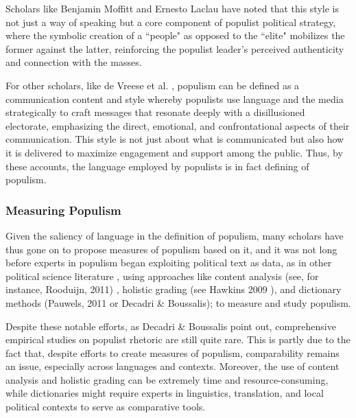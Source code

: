 \documentclass[12pt,letterpaper]{article}
\begin{document}
Scholars like Benjamin Moffitt\autocite{moffittGlobalRisePopulism2016} and Ernesto Laclau\autocite{benvenutoPopulistReasonErnesto2012} have noted that this style is not just a way of speaking but a core component of populist political strategy, where the symbolic creation of a ``people" as opposed to the ``elite" mobilizes the former against the latter, reinforcing the populist leader's perceived authenticity and connection with the masses. 

For other scholars, like de Vreese et al.\autocite{devreesePopulismExpressionPolitical2018} , populism can be defined as a communication content and style whereby populists use language and the media strategically to craft messages that resonate deeply with a disillusioned electorate, emphasizing the direct, emotional, and confrontational aspects of their communication. This style is not just about what is communicated but also how it is delivered to maximize engagement and support among the public. Thus, by these accounts, the language employed by populists is in fact defining of populism. 

\vspace{.25cm}
\subsubsection{Measuring Populism}

\vspace{.25cm}
\noindent Given the saliency of language in the definition of populism, many scholars have thus gone on to propose measures of populism based on it, and it was not long before experts in populism began exploiting political text as data, as in other political science literature \autocite{wilkersonLargeScaleComputerizedText2017} , using approaches like content analysis (see, for instance, Rooduijn, 2011\autocite{rooduijnMeasuringPopulismComparing2011}) , holistic grading (see Hawkins 2009 \autocite{hawkinsChavezPopulistMeasuring2009}), and dictionary methods (Pauwels, 2011\autocite{pauwelsMeasuringPopulismQuantitative2011} or Decadri \& Boussalis\autocite{decadriPopulismPartyMembership2020}); to measure and study populism. 

\noindent Despite these notable efforts, as Decadri \& Boussalis\autocite{decadriPopulismPartyMembership2020} point out, comprehensive empirical studies on populist rhetoric are still quite rare. This is partly due to the fact that, despite efforts to create measures of populism, comparability remains an issue, especially across languages and contexts. Moreover, the use of content analysis and holistic grading can be extremely time and resource-consuming, while dictionaries might require experts in linguistics, translation, and local political contexts to serve as comparative tools. 
\end{document}
